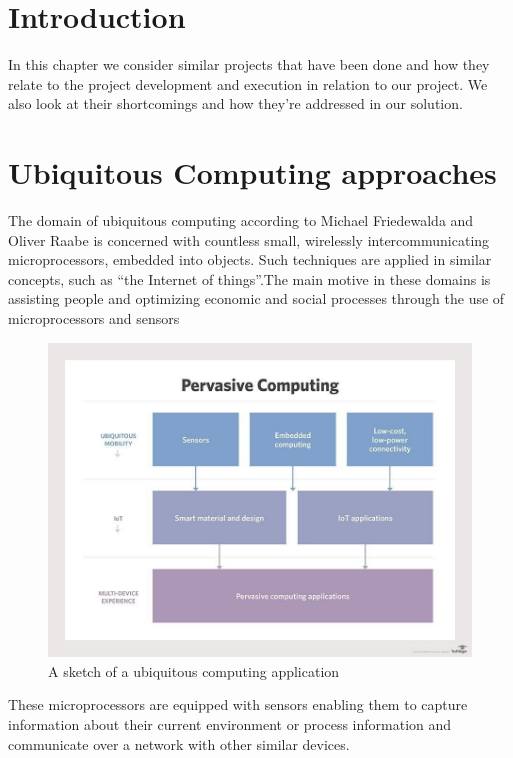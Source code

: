 \section{Introduction}
In this chapter we consider similar projects that have been done and how they relate to the project development and execution in relation to our project. We also look at their shortcomings and how they're addressed in our solution.


\section{Ubiquitous Computing approaches}
The domain of ubiquitous computing according to Michael Friedewalda and Oliver Raabe is concerned with countless small, wirelessly intercommunicating microprocessors, embedded into objects. Such techniques are applied in similar concepts, such as ``the Internet of things''.The main motive in these domains is assisting people and optimizing economic and social processes through the use of microprocessors and sensors

\begin{figure}[h]
    \begin{center}
        \includegraphics[scale = 0.4]{images/ubq}
        \caption{A sketch of a ubiquitous computing application}
    \end{center}
\end{figure}
These microprocessors are equipped with sensors enabling them to capture information about their current environment or process information and communicate over a network with other similar devices\cite{friedewald_ubiquitous_2011}.

